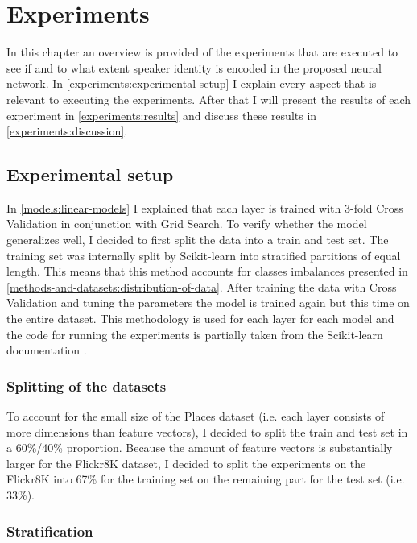 \documentclass[a4paper, oneside]{book}
\begin{document}
\chapter{Experiments}\label{chapter:experiments}

In this chapter an overview is provided of the experiments that are executed to see if and to what extent speaker identity is encoded in the proposed neural network. In \autoref{experiments:experimental-setup} I explain every aspect that is relevant to executing the experiments. After that I will present the results of each experiment in \autoref{experiments:results} and discuss these results in \autoref{experiments:discussion}.

\section{Experimental setup}\label{experiments:experimental-setup}

In \autoref{models:linear-models} I explained that each layer is trained with 3-fold Cross Validation in conjunction with Grid Search. To verify whether the model generalizes well, I decided to first split the data into a train and test set. The training set was internally split by Scikit-learn into stratified partitions of equal length. This means that this method accounts for classes imbalances presented in \autoref{methods-and-datasets:distribution-of-data}. After training the data with Cross Validation and tuning the parameters the model is trained again but this time on the entire dataset. This methodology is used for each layer for each model and the code for running the experiments is partially taken from the Scikit-learn documentation \cite{scikitlearn2017}. 

\subsection{Splitting of the datasets}\label{experimental-setup:splitting-of-the-datasets}

To account for the small size of the Places dataset (i.e. each layer consists of more dimensions than feature vectors), I decided to split the train and test set in a 60\%/40\% proportion. Because the amount of feature vectors is substantially larger for the Flickr8K dataset, I decided to split the experiments on the Flickr8K into 67\% for the training set on the remaining part for the test set (i.e. 33\%). 

\subsection{Stratification}\label{experimental-setup:stratification}
\end{document}
